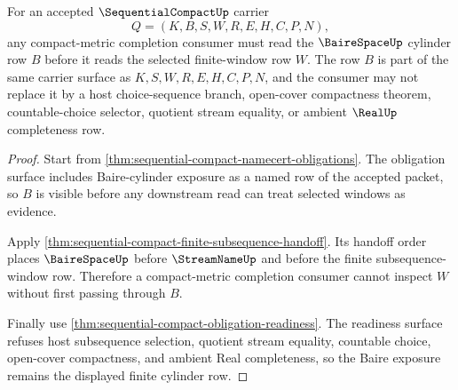 \begin{theorem}
\label{thm:sequential-compact-baire-cylinder-exposure}
For an accepted $\SequentialCompactUp$ carrier
$$
Q=(K,B,S,W,R,E,H,C,P,N),
$$
any compact-metric completion consumer must read the $\BaireSpaceUp$ cylinder row $B$ before it reads the selected finite-window row $W$. The row $B$ is part of the same carrier surface as $K,S,W,R,E,H,C,P,N$, and the consumer may not replace it by a host choice-sequence branch, open-cover compactness theorem, countable-choice selector, quotient stream equality, or ambient $\RealUp$ completeness row.
\end{theorem}
\begin{proof}
Start from \autoref{thm:sequential-compact-namecert-obligations}. The obligation surface includes Baire-cylinder exposure as a named row of the accepted packet, so $B$ is visible before any downstream read can treat selected windows as evidence.

Apply \autoref{thm:sequential-compact-finite-subsequence-handoff}. Its handoff order places $\BaireSpaceUp$ before $\StreamNameUp$ and before the finite subsequence-window row. Therefore a compact-metric completion consumer cannot inspect $W$ without first passing through $B$.

Finally use \autoref{thm:sequential-compact-obligation-readiness}. The readiness surface refuses host subsequence selection, quotient stream equality, countable choice, open-cover compactness, and ambient Real completeness, so the Baire exposure remains the displayed finite cylinder row.
\end{proof}

